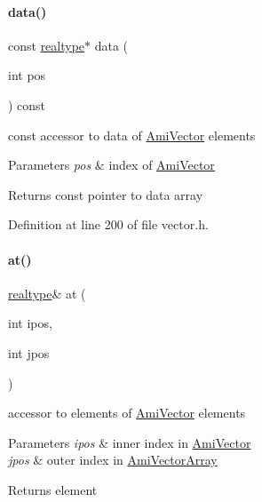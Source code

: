 \paragraph{\texorpdfstring{data()}{data()}\hspace{0.1cm}{\footnotesize\ttfamily [2/2]}}
{\footnotesize\ttfamily const \mbox{\hyperlink{namespaceamici_a1bdce28051d6a53868f7ccbf5f2c14a3}{realtype}}$\ast$ data (\begin{DoxyParamCaption}\item[{int}]{pos }\end{DoxyParamCaption}) const}

const accessor to data of \mbox{\hyperlink{classamici_1_1_ami_vector}{Ami\+Vector}} elements 
\begin{DoxyParams}{Parameters}
{\em pos} & index of \mbox{\hyperlink{classamici_1_1_ami_vector}{Ami\+Vector}} \\
\hline
\end{DoxyParams}
\begin{DoxyReturn}{Returns}
const pointer to data array 
\end{DoxyReturn}


Definition at line 200 of file vector.\+h.

\mbox{\label{classamici_1_1_ami_vector_array_a214f110ad614eb97ec2c6f3b6a9f2c8c}} 
\paragraph{\texorpdfstring{at()}{at()}\hspace{0.1cm}{\footnotesize\ttfamily [1/2]}}
{\footnotesize\ttfamily \mbox{\hyperlink{namespaceamici_a1bdce28051d6a53868f7ccbf5f2c14a3}{realtype}}\& at (\begin{DoxyParamCaption}\item[{int}]{ipos,  }\item[{int}]{jpos }\end{DoxyParamCaption})}

accessor to elements of \mbox{\hyperlink{classamici_1_1_ami_vector}{Ami\+Vector}} elements 
\begin{DoxyParams}{Parameters}
{\em ipos} & inner index in \mbox{\hyperlink{classamici_1_1_ami_vector}{Ami\+Vector}} \\
\hline
{\em jpos} & outer index in \mbox{\hyperlink{classamici_1_1_ami_vector_array}{Ami\+Vector\+Array}} \\
\hline
\end{DoxyParams}
\begin{DoxyReturn}{Returns}
element 
\end{DoxyReturn}


